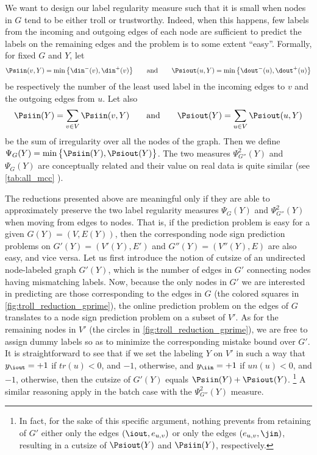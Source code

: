We want to design our label regularity measure such that it is small when
nodes in $G$ tend to be either troll or trustworthy. Indeed, when this happens, few labels from the
incoming and outgoing edges of each node are sufficient to predict the labels on the remaining
edges and the \esp{} problem is to some extent \enquote{easy}. Formally, for fixed $G$ and $Y$, let 
$$
\Psiin(v,Y) = \min\big\{\din^-(v),\din^+(v)\big\}
\qquad\text{and}\qquad
\Psiout(u,Y) = \min\big\{\dout^-(u),\dout^+(u)\big\}
$$
be respectively the number of the least used label in the incoming edges to $v$ and the outgoing
edges from $u$.
Let also
$$
\Psiin(Y) = \sum_{v \in V} \Psiin(v,Y)
\qquad\text{and}\qquad
\Psiout(Y) = \sum_{u \in V} \Psiout(u,Y)
$$
be the sum of irregularity over all the nodes of the graph.
Then we define $\Psi_G(Y) = \min\big\{\Psiin(Y),\Psiout(Y)\big\}$. The two measures
$\Psi^2_{G''}(Y)$ and $\Psi_G(Y)$ are conceptually related and their value on real data is quite
similar (see \autoref{tab:all_mcc} ).

The reductions presented above are meaningful only if they are able to approximately preserve the
two label regularity measures $\Psi_G(Y)$ and $\Psi^2_{G''}(Y)$ when moving from edges to nodes.
That is, if the \esp{} prediction problem is
easy for a given $G(Y) = (V,E(Y))$, then the corresponding node sign prediction problems on $G'(Y)
= (V'(Y),E')$ and $G''(Y) = (V''(Y),E)$ are also easy, and vice versa.
Let us first introduce the notion of cutsize of an undirected node-labeled graph $G'(Y)$, which is
the number of edges in $G'$ connecting nodes having mismatching labels.
  Now, because the only nodes in $G'$ we are
  interested in predicting are those corresponding to the edges in $G$ (the colored squares in
  \autoref{fig:troll_reduction_gprime}), the online prediction problem on the edges of $G$ translates to a node
  sign prediction problem on a subset of $V'$. As for the remaining nodes in $V'$ (the circles in
  \autoref{fig:troll_reduction_gprime}), we are free to assign dummy labels so as to minimize the corresponding mistake
  bound over $G'$. It is straightforward to see that if we set the labeling $Y$ on $V'$ in such a
  way that $y_{\iout} = +1$ if $tr(u) < 0$, and $-1$, otherwise, and $y_{\iin} = +1$ if $un(u) <
  0$, and $-1$, otherwise, then the cutsize of $G'(Y)$ equals  $\Psiin(Y) + \Psiout(Y)$.%
  \footnote{In fact, for the sake of
  this specific argument, nothing prevents from retaining of $G'$ either only the edges
  $(\iout,e_{u,v})$ or only the edges $(e_{u,v},\jin)$, resulting in a cutsize of $\Psiout(Y)$ and
  $\Psiin(Y)$, respectively.}
  A similar reasoning apply in the batch case with the $\Psi^2_{G''}(Y)$ measure.
